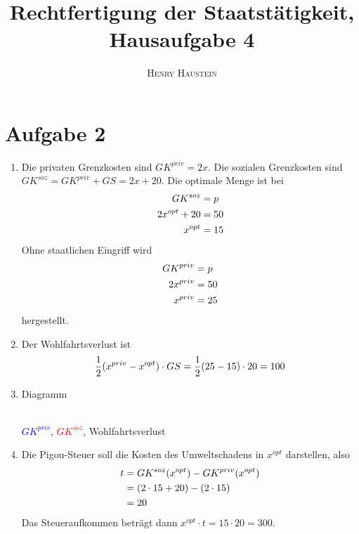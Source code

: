 \documentclass{article}
\title{\textbf{Rechtfertigung der Staatstätigkeit, Hausaufgabe 4}}
\author{\textsc{Henry Haustein}}
\date{}
\begin{document}
	\maketitle
	
	\section*{Aufgabe 2}
	\begin{enumerate}[label=(\alph*)]
		\item Die privaten Grenzkosten sind $GK^{priv}=2x$. Die sozialen Grenzkosten sind $GK^{soz}=GK^{priv} + GS = 2x + 20$. Die optimale Menge ist bei
		\begin{align}
			GK^{soz} &= p \notag \\
			2x^{opt} + 20 &= 50 \notag \\
			x^{opt} &= 15 \notag
		\end{align}
		Ohne staatlichen Eingriff wird
		\begin{align}
			GK^{priv} &= p \notag \\
			2x^{priv} &= 50 \notag \\
			x^{priv} &= 25 \notag
		\end{align}
		hergestellt.
		\item Der Wohlfahrtsverlust ist
		\begin{align}
			\frac{1}{2}(x^{priv} - x^{opt}) \cdot GS = \frac{1}{2}(25-15)\cdot 20 = 100 \notag
		\end{align}
		\item Diagramm
		\begin{center}
			 \\
			\textcolor{blue}{$GK^{priv}$}, \textcolor{red}{$GK^{soz}$}, \textcolor{green!80!black}{Wohlfahrtsverlust}
		\end{center}
		\item Die Pigou-Steuer soll die Kosten des Umweltschadens in $x^{opt}$ darstellen, also
		\begin{align}
			t &= GK^{soz}(x^{opt}) - GK^{priv}(x^{opt}) \notag \\
			&= (2\cdot 15+20) - (2\cdot 15) \notag \\
			&= 20 \notag
		\end{align}
		Das Steueraufkommen beträgt dann $x^{opt}\cdot t = 15\cdot 20 = 300$.
	\end{enumerate}
	
\end{document}
